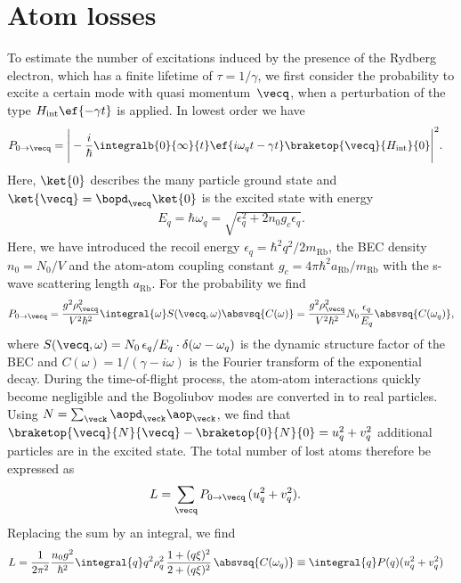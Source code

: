 \section{Atom losses}
To estimate the number of excitations induced by the presence of the Rydberg electron, which has a finite lifetime of $\tau=1/\gamma$, we first consider the probability to excite a certain mode with quasi momentum~$\vecq$, when a perturbation of the type $H_\text{int} \ef{-\gamma t}$ is applied. In lowest order we have
\begin{align}
P_{0\rightarrow\vecq}&=\Bigg|-\frac{i}{\hbar}\integralb{0}{\infty}{t}\ef{i\omega_{q}t-\gamma t}\braketop{\vecq}{H_\text{int}}{0}\Bigg|^2.
\end{align}
Here, $\ket{0}$ describes the many particle ground state and $\ket{\vecq}=\bopd_{\vecq}\ket{0}$ is the excited state with energy
\begin{align}
    E_{q}=\hbar\omega_{q}=\sqrt{\epsilon_{q}^2+2n_0g_c\epsilon_{q}}.
\end{align}
Here, we have introduced the recoil energy $\epsilon_{q}=\hbar^2 q^2/2m_\text{Rb}$, the BEC density $n_0=N_0/V$ and the atom-atom coupling constant $g_c=4\pi \hbar ^2a_{\text{Rb}}/m_{\text{Rb}}$ with the s-wave scattering length $a_{\text{Rb}}$.
For the probability we find
\begin{align}
P_{0\rightarrow\vecq}=\frac{g^2 \rho_{\vecq}^2 }{V^2\hbar^2}   \integral{\omega}S(\vecq,\omega)\absvsq{C(\omega)} = \frac{g^2 \rho_{\vecq}^2}{V^2\hbar^2} N_0 \frac{\epsilon_{q}}{E_{q}} \absvsq{C(\omega_q)},
\end{align}
where $S({\vecq},\omega)=N_0 \,\epsilon_{q}/E_{q} \cdot \delta(\omega-\omega_{q})$ is the dynamic structure factor of the BEC and $C(\omega)=1/(\gamma-i \omega)$ is the Fourier transform of the exponential decay.
During the time-of-flight process, the atom-atom interactions quickly become negligible and the Bogoliubov modes are converted in to real particles. Using $N=\sum_{\veck} \aopd_{\veck}\aop_{\veck}$, we find that $\braketop{\vecq}{N}{\vecq}-\braketop{0}{N}{0} = u_{q}^2+v_{q}^2$ additional particles are in the excited state. The total number of lost atoms therefore be expressed as
\begin{align}
L &= \sum_{\vecq} P_{0\rightarrow\vecq}\, (u_{q}^2+v_{q}^2).
\end{align}
Replacing the sum by an integral, we find
\begin{align}
L&= \frac{1}{2\pi^2}\frac{n_0 g^2}{\hbar^2} \integral{q} q^2\rho_q^2\,\frac{1+(q\xi)^2}{2+(q\xi)^2} \, \absvsq{C(\omega_q)}  \equiv \integral{q} P(q) (u_{q}^2+v_{q}^2)
\end{align}
